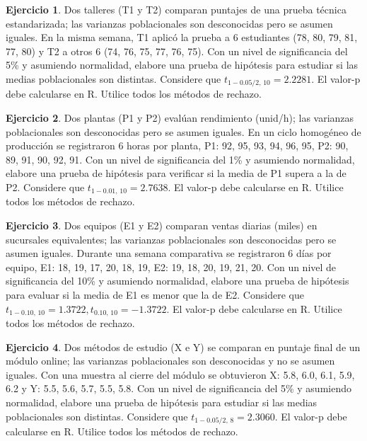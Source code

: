 \documentclass[
  11pt,
]{book}
\theoremstyle{definition}
\theoremstyle{definition}
\theoremstyle{definition}
\newtheorem{exercise}{Ejercicio}[chapter]
\theoremstyle{definition}
\theoremstyle{remark}
\begin{document}
\begin{exercise}
Dos talleres (T1 y T2) comparan puntajes de una prueba técnica estandarizada; las varianzas poblacionales son desconocidas pero se asumen iguales. En la misma semana, T1 aplicó la prueba a 6 estudiantes (78, 80, 79, 81, 77, 80) y T2 a otros 6 (74, 76, 75, 77, 76, 75). Con un nivel de significancia del 5\% y asumiendo normalidad, elabore una prueba de hipótesis para estudiar si las medias poblacionales son distintas. Considere que \(t_{1-0.05/2,\,10}=2.2281\). El valor-p debe calcularse en R. Utilice todos los métodos de rechazo.
\end{exercise}

\begin{exercise}
Dos plantas (P1 y P2) evalúan rendimiento (unid/h); las varianzas poblacionales son desconocidas pero se asumen iguales. En un ciclo homogéneo de producción se registraron 6 horas por planta, P1: 92, 95, 93, 94, 96, 95, P2: 90, 89, 91, 90, 92, 91. Con un nivel de significancia del 1\% y asumiendo normalidad, elabore una prueba de hipótesis para verificar si la media de P1 supera a la de P2. Considere que \(t_{1-0.01,\,10}=2.7638\). El valor-p debe calcularse en R. Utilice todos los métodos de rechazo.
\end{exercise}

\begin{exercise}
Dos equipos (E1 y E2) comparan ventas diarias (miles) en sucursales equivalentes; las varianzas poblacionales son desconocidas pero se asumen iguales. Durante una semana comparativa se registraron 6 días por equipo, E1: 18, 19, 17, 20, 18, 19, E2: 19, 18, 20, 19, 21, 20. Con un nivel de significancia del 10\% y asumiendo normalidad, elabore una prueba de hipótesis para evaluar si la media de E1 es menor que la de E2. Considere que \(t_{1-0.10,\,10}=1.3722, t_{0.10,\,10}=-1.3722\). El valor-p debe calcularse en R. Utilice todos los métodos de rechazo.
\end{exercise}

\begin{exercise}
Dos métodos de estudio (X e Y) se comparan en puntaje final de un módulo online; las varianzas poblacionales son desconocidas y no se asumen iguales. Con una muestra al cierre del módulo se obtuvieron X: 5.8, 6.0, 6.1, 5.9, 6.2 y Y: 5.5, 5.6, 5.7, 5.5, 5.8. Con un nivel de significancia del 5\% y asumiendo normalidad, elabore una prueba de hipótesis para estudiar si las medias poblacionales son distintas. Considere que \(t_{1-0.05/2,\,8}=2.3060\). El valor-p debe calcularse en R. Utilice todos los métodos de rechazo.
\end{exercise}
\end{document}
